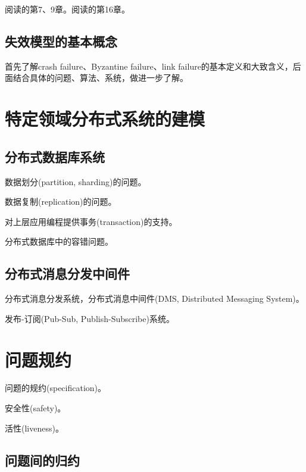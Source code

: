 \myleaf 阅读\cite{Attiya04}的第7、9章。阅读\cite{Aspnes19}的第16章。

\subsection{失效模型的基本概念}

首先了解crash failure、Byzantine failure、link failure的基本定义和大致含义，后面结合具体的问题、算法、系统，做进一步了解。


\section{特定领域分布式系统的建模}

\subsection{分布式数据库系统}

数据划分(partition, sharding)的问题。

数据复制(replication)的问题。

对上层应用编程提供事务(transaction)的支持。

分布式数据库中的容错问题。


\subsection{分布式消息分发中间件}

分布式消息分发系统，分布式消息中间件(DMS, Distributed Messaging System)。

发布-订阅(Pub-Sub, Publish-Subscribe)系统。




\section{问题规约}

问题的规约(specification)。

安全性(safety)。

活性(liveness)。

\subsection{问题间的归约}

